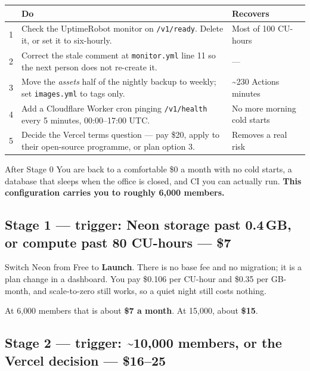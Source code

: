 \documentclass[11pt,a4paper]{article}
\newcommand{\hd}[1]{\textbf{\sffamily\small #1}}
\begin{document}
\begin{center}
\begin{tabular}{@{}p{0.5cm}L{9.3cm}L{4.6cm}@{}}
\toprule
& \hd{Do} & \hd{Recovers} \\
 & Check the UptimeRobot monitor on \texttt{/v1/ready}. Delete it, or set it to six-hourly. & Most of 100 CU-hours \\
2 & Correct the stale comment at \texttt{monitor.yml} line 11 so the next person does not re-create it. & --- \\
3 & Move the \emph{assets} half of the nightly backup to weekly; set \texttt{images.yml} to tags only. & \textasciitilde230 Actions minutes \\
4 & Add a Cloudflare Worker cron pinging \texttt{/v1/health} every 5 minutes, 00:00--17:00 UTC. & No more morning cold starts \\
5 & Decide the Vercel terms question --- pay \$20, apply to their open-source programme, or plan option 3. & Removes a real risk \\
\bottomrule
\end{tabular}
\end{center}

\begin{keybox}{After Stage 0}
You are back to a comfortable \$0 a month with no cold starts, a database that sleeps when the office is closed, and CI you can actually run. \textbf{This configuration carries you to roughly 6{,}000 members.}
\end{keybox}

\subsection{Stage 1 --- trigger: Neon storage past 0.4\,GB, or compute past 80 CU-hours --- \$7}

Switch Neon from Free to \textbf{Launch}. There is no base fee and no migration; it is a plan change in a dashboard. You pay \$0.106 per CU-hour and \$0.35 per GB-month, and scale-to-zero still works, so a quiet night still costs nothing.

At 6{,}000 members that is about \textbf{\$7 a month}. At 15{,}000, about \textbf{\$15}.

\subsection{Stage 2 --- trigger: \textasciitilde10{,}000 members, or the Vercel decision --- \$16--25}
\end{document}

